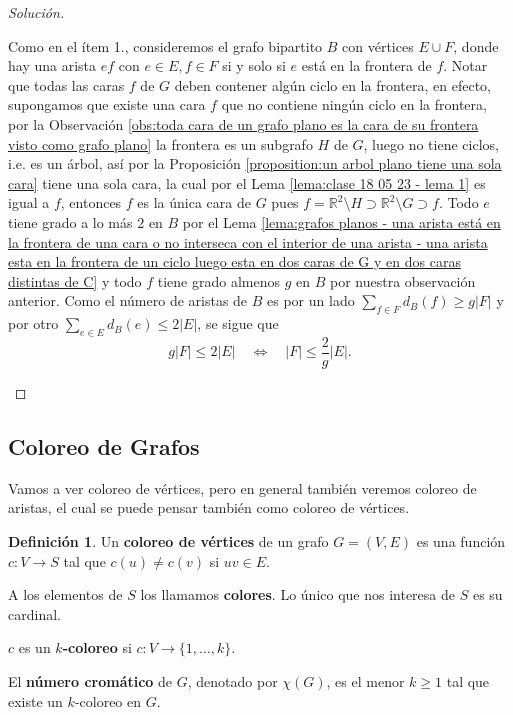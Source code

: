 \documentclass[12pt]{report}
\theoremstyle{plain}
\theoremstyle{definition}
\newtheorem{definition}[theorem]{Definición}
\newenvironment{solution}{\begin{proof}[Solución]}{\end{proof}}
\newcommand{\reals}{\mathbb{R}}
\newcommand{\abs}[1]{\left \vert #1 \right \vert}
\begin{document}
\begin{solution}
\begin{enumerate}
 Como en el ítem 1., consideremos el grafo bipartito $B$ con vértices $E \cup F$, donde hay una arista $ef$ con $e \in E, f \in F$ si y solo si $e$ está en la frontera de $f$. Notar que todas las caras $f$ de $G$ deben contener algún ciclo en la frontera, en efecto, supongamos que existe una cara $f$ que no contiene ningún ciclo en la frontera, por la Observación \ref{obs:toda cara de un grafo plano es la cara de su frontera visto como grafo plano} la frontera es un subgrafo $H$ de $G$, luego no tiene ciclos, i.e. es un árbol, así por la Proposición \ref{proposition:un arbol plano tiene una sola cara} tiene una sola cara, la cual por el Lema \ref{lema:clase 18 05 23 - lema 1} es igual a $f$, entonces $f$ es la única cara de $G$ pues $f = \reals^2 \setminus H  \supset \reals^2 \setminus G \supset f$. Todo $e$ tiene grado a lo más $2$ en $B$ por el Lema \ref{lema:grafos planos - una arista está en la frontera de una cara o no interseca con el interior de una arista - una arista esta en la frontera de un ciclo luego esta en dos caras de G y en dos caras distintas de C} y todo $f$ tiene grado almenos $g$ en $B$ por nuestra observación anterior. Como el número de aristas de $B$ es por un lado $\sum_{f \in F} d_B (f) \geq g \abs F$ y por otro $\sum_{e \in E} d_B (e) \leq 2 \abs E$, se sigue que
 \[
     g \abs F \leq 2 \abs E \quad \Leftrightarrow \quad \abs F \leq \frac 2 g \abs E.
 \]
\end{enumerate}
\end{solution}








\subsection{Coloreo de Grafos}

Vamos a ver coloreo de vértices, pero en general también veremos coloreo de aristas, el cual se puede pensar también como coloreo de vértices.

\begin{definition}
Un \textbf{coloreo de vértices} de un grafo $G = (V,E)$ es una función $c : V \rightarrow S$ tal que $c(u) \neq c(v)$ si $uv \in E$.


A los elementos de $S$ los llamamos \textbf{colores}. Lo único que nos interesa de $S$ es su cardinal.

$c$ es un \textbf{$k$-coloreo} si $c : V \rightarrow \{1, \ldots, k\}$.

El \textbf{número cromático} de $G$, denotado por $\chi (G)$, es el menor $k \geq 1$ tal que existe un $k$-coloreo en $G$.
\end{definition}
\end{document}
